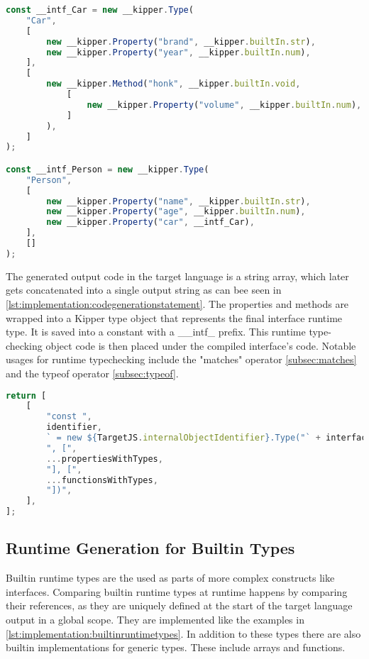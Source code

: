 \begin{lstlisting}[language=Typescript,caption=The runtime representation of the previous interfaces,label=lst:implementation:runtimeinterface]
const __intf_Car = new __kipper.Type(
	"Car",
	[
		new __kipper.Property("brand", __kipper.builtIn.str),
		new __kipper.Property("year", __kipper.builtIn.num),
	],
	[
		new __kipper.Method("honk", __kipper.builtIn.void, 
			[
				new __kipper.Property("volume", __kipper.builtIn.num),
			]
		),
	]
);

const __intf_Person = new __kipper.Type(
	"Person",
	[
		new __kipper.Property("name", __kipper.builtIn.str),
		new __kipper.Property("age", __kipper.builtIn.num),
		new __kipper.Property("car", __intf_Car),
	],
	[]
);
\end{lstlisting}

The generated output code in the target language is a string array, which later gets concatenated into a single output string as can bee seen in \ref{lst:implementation:codegenerationstatement}. The properties and methods are wrapped into a Kipper type object that represents the final interface runtime type. It is saved into a constant with a \_\_intf\_ prefix. This runtime type-checking object code is then placed under the compiled interface's code. Notable usages for runtime typechecking include the "matches" operator \ref{subsec:matches} and the typeof operator \ref{subsec:typeof}.

\begin{lstlisting}[language=Typescript,caption=Code generation statement ,label=lst:implementation:codegenerationstatement]
return [
	[
		"const ",
		identifier,
		` = new ${TargetJS.internalObjectIdentifier}.Type("` + interfaceName + '"',
		", [",
		...propertiesWithTypes,
		"], [",
		...functionsWithTypes,
		"])",
	],
];
\end{lstlisting}

\subsection{Runtime Generation for Builtin Types}
Builtin runtime types are the used as parts of more complex constructs like interfaces. Comparing builtin runtime types at runtime happens by comparing their references, as they are uniquely defined at the start of the target language output in a global scope. They are implemented like the examples in  \ref{lst:implementation:builtinruntimetypes}. In addition to these types there are also builtin implementations for generic types. These include arrays and functions.

